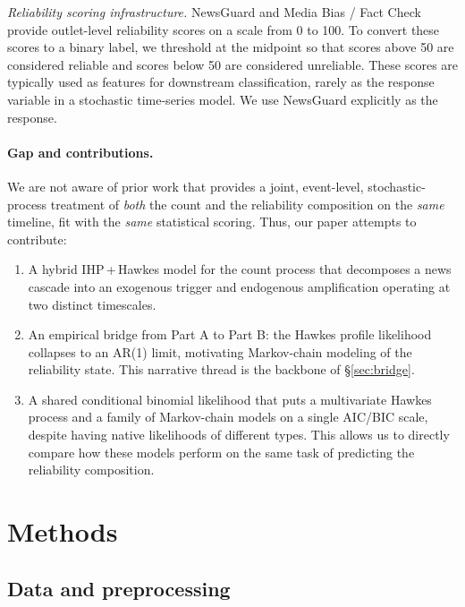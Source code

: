 \documentclass[11pt]{article}
\begin{document}
\emph{Reliability scoring infrastructure.} NewsGuard and Media Bias / Fact
Check provide outlet-level reliability scores on a scale from 0 to 100. To convert these 
scores to a binary label, we threshold at the midpoint so that scores above 50 are considered
reliable and scores below 50 are considered unreliable. These scores are typically used as
features for downstream classification, rarely as the response variable in a
stochastic time-series model. We use NewsGuard explicitly as the response.

\paragraph{Gap and contributions.} We are not aware of prior work that
provides a joint, event-level, stochastic-process treatment of \emph{both} the
count and the reliability composition on the \emph{same} timeline, fit with
the \emph{same} statistical scoring. Thus, our paper attempts to contribute:
\begin{enumerate}
  \item A hybrid IHP\,+\,Hawkes model for the count process that decomposes a
        news cascade into an exogenous trigger and endogenous amplification
        operating at two distinct timescales.
  \item An empirical bridge from Part A to Part B: the Hawkes profile
        likelihood collapses to an AR(1) limit, motivating Markov-chain
        modeling of the reliability state. This narrative thread is the
        backbone of \S\ref{sec:bridge}.
  \item A shared conditional binomial likelihood that puts a multivariate
        Hawkes process and a family of Markov-chain models on a single AIC/BIC
        scale, despite having native likelihoods of different types. This allows
        us to directly compare how these models perform on the same task of predicting 
        the reliability composition.
  
\end{enumerate}

\section{Methods}
\label{sec:methods}

\subsection{Data and preprocessing}
\label{sec:data}
\end{document}

